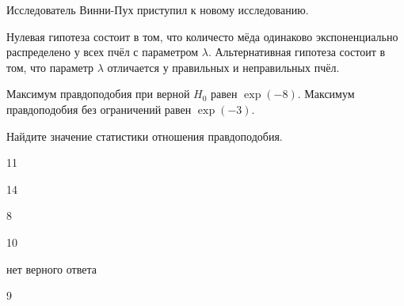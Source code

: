 
\begin{question}
Исследователь Винни-Пух приступил к новому исследованию.

Нулевая гипотеза состоит в том, что количесто мёда одинаково
экспоненциально распределено у всех пчёл с параметром \(\lambda\).
Альтернативная гипотеза состоит в том, что параметр \(\lambda\)
отличается у правильных и неправильных пчёл.

Максимум правдоподобия при верной \(H_0\) равен \(\exp(-8)\). Максимум
правдоподобия без ограничений равен \(\exp(-3)\).

Найдите значение статистики отношения правдоподобия.
\begin{answerlist}
  \item 11
  \item 14
  \item 8
  \item 10
  \item нет верного ответа
  \item 9
\end{answerlist}
\end{question}


